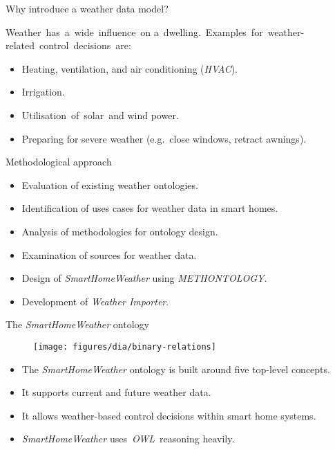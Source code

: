 \documentclass[final,hyperref={pdfpagelabels=true}]{beamer}
\begin{document}
\begin{frame}[fragile]
\begin{columns}[t]
\begin{column}{.45\textwidth}
\begin{block}{Why introduce a weather data model?}
	\vspace{-1.5em}
	
	\mbox{Weather has a wide influence on}
	\mbox{a dwelling. Examples for weather-}
	\mbox{related control decisions are:}
	
	\begin{itemize}
  	  \item Heating, ventilation, and air conditioning (\emph{HVAC}).
	  \item Irrigation.
	  \item \mbox{Utilisation of solar and} wind power.
	\end{itemize}

	\vspace{-.2em}
	\begin{itemize}
	  \item Preparing for severe weather (e.g.\ close windows, retract awnings).
	\end{itemize}
      \end{block}

      \begin{block}{Methodological approach}
	\vspace{-.5em}
	\begin{itemize}
	  \item Evaluation of existing weather ontologies.
	  \item Identification of uses cases for weather data in smart homes.
	  \item Analysis of methodologies for ontology design.
	  \item Examination of sources for weather data.
	  \item Design of \emph{SmartHomeWeather} using \emph{METHONTOLOGY}. %
	  \item Development of \emph{Weather Importer}.
	\end{itemize}
      \end{block}

      \begin{block}{The \emph{SmartHomeWeather} ontology}
        \begin{wrapfigure}{r}{.55\textwidth}
	  \vspace{-.5em}
	  \centering
  	  \texttt{[image: figures/dia/binary-relations]}
	\end{wrapfigure}

	\vspace{-1.5em}

	\begin{itemize}
	  \item The \emph{SmartHomeWeather} ontology is built around five top-level concepts.
	  \item It supports current and future weather data.
	  \item It allows weather-based control decisions within smart home systems.
	  \item \emph{SmartHomeWeather} \mbox{uses \emph{OWL} reasoning} heavily.
	\end{itemize}


\end{block}
\end{column}
\end{columns}
\end{frame}
\end{document}

